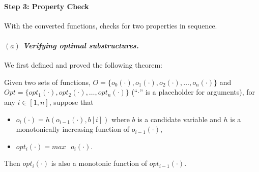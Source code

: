 


\paragraph{Step 3: Property Check}
With the converted functions, \tool checks for two properties in sequence. 

\paragraph{$(a)$ \emph{Verifying optimal substructures.}}
We first defined and proved the following theorem:

\begin{theorem}
\label{thm1}
Given two sets of functions, $O=\{o_0(\cdot), o_1(\cdot), o_2(\cdot),  \ldots, o_n(\cdot)\}$ and  $Opt=\{opt_1(\cdot), opt_2(\cdot), \ldots, opt_n(\cdot)\}$ (``$\cdot$'' is a placeholder for arguments), for any $i\in[1, n]$, suppose that
\begin{itemize}
    \item $o_i(\cdot)=h(o_{i-1}(\cdot), b[i])$ where $b$ is a candidate variable and $h$ is a monotonically increasing function of $o_{i-1}(\cdot)$,  
    \item $opt_i(\cdot)=max\text{ }o_i(\cdot)$. 
\end{itemize}
Then $opt_i(\cdot)$ is also a monotonic function of $opt_{i-1}(\cdot)$. 
\end{theorem}

